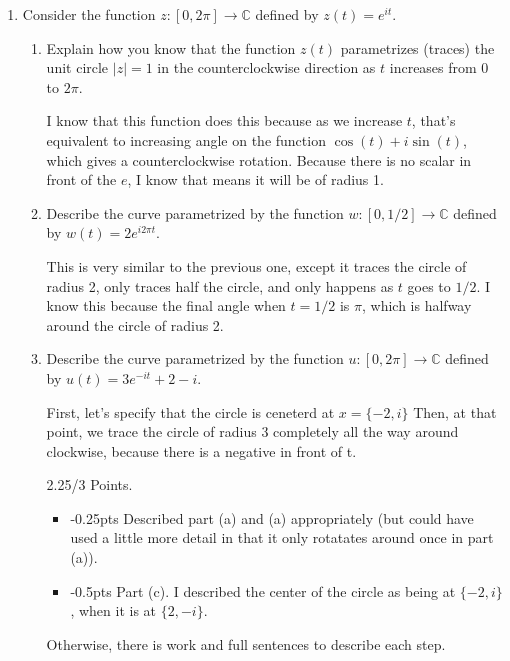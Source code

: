 \begin{enumerate}
	\item Consider the function $z: [0,2\pi] \to \mathbb{C}$ defined by $z(t) = e^{it}$. 
	\begin{enumerate}
		\item Explain how you know that the function $z(t)$ parametrizes (traces) the unit circle $|z|=1$ in the counterclockwise direction as $t$ increases from $0$ to $2\pi$. 
		\begin{problem}
			I know that this function does this because as we increase $t$, that's equivalent to increasing angle on the function $\cos(t) + i\sin(t)$, which gives a counterclockwise rotation. Because there is no scalar in front of the $e$, I know that means it will be of radius 1. 
		\end{problem}
		\item Describe the curve parametrized by the function $w: [0, 1/2] \to \mathbb{C}$ defined by $w(t) = 2e^{i2\pi t}$.
		\begin{problem}
			This is very similar to the previous one, except it traces the circle of radius 2, only traces half the circle, and only happens as $t$ goes to $1/2$. I know this because the final angle when $t=1/2$ is $\pi$, which is halfway around the circle of radius 2. 
		\end{problem}
		\item Describe the curve parametrized by the function $u: [0, 2\pi] \to \mathbb{C}$ defined by $u(t) = 3e^{-it} + 2-i$.
		\begin{problem}
			First, let's specify that the circle is ceneterd at $x = \{-2, i\}$ Then, at that point, we trace the circle of radius 3 completely all the way around clockwise, because there is a negative in front of t. 
		\end{problem}
		\begin{grade}
			2.25/3 Points. 
			\begin{itemize}
				\item -0.25pts Described part (a) and (a) appropriately (but could have used a little more detail in that it only rotatates around once in part (a)). 
				\item -0.5pts Part (c). I described the center of the circle as being at $\{-2, i\}$, when it is at $\{2, -i\}$. 
			\end{itemize}
			Otherwise, there is work and full sentences to describe each step. 
		\end{grade}
	\end{enumerate}


\end{enumerate}
